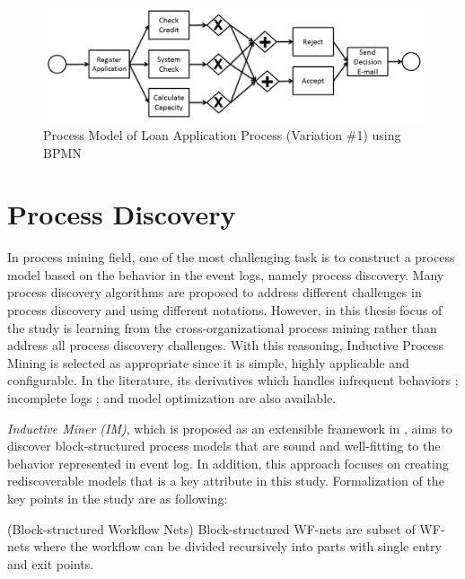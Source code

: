 \begin{figure}
  \centering
  \includegraphics[width=\textwidth]{3_background/loan-bpmn}
  \caption{Process Model of Loan Application Process  (Variation \#1) using BPMN}
  \label{fig:loan-bpmn}
\end{figure}


\section{Process Discovery}
\label{sec:process-discovery}
In process mining field, one of the most challenging task is to construct a process model based on the behavior in the event logs, namely process discovery. Many process discovery algorithms are proposed to address different challenges in process discovery and using different notations. However, in this thesis focus of the study is learning from the cross-organizational process mining rather than address all process discovery challenges. With this reasoning, Inductive Process Mining \cite{leemans2013discovering} is selected as appropriate since it is simple, highly applicable and configurable. In the literature, its derivatives which handles infrequent behaviors \cite{leemans2014discoveringinfrequent}; incomplete logs \cite{leemans2014discoveringincomplete}; and model optimization \cite{weidlich2012profiles} are also available.  

\textit{Inductive Miner (IM)}, which is proposed as an extensible framework in \cite{leemans2013discovering}, aims to discover block-structured process models that are sound and well-fitting to the behavior represented in event log. In addition, this approach focuses on creating rediscoverable models that is a key attribute in this study. Formalization of the key points in the study \cite{leemans2013discovering} are as following:

\theoremstyle{definition}
\begin{definition}{}
(Block-structured Workflow Nets) Block-structured WF-nets are subset of WF-nets where the workflow can be divided recursively into  parts with single entry and exit points.  
\end{definition}

